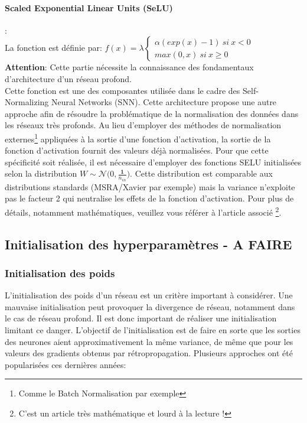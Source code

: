 \paragraph{Scaled Exponential Linear Units (SeLU)}: \\
La fonction est définie par: $f(x)=\lambda\left\{\begin{array}{ll} \alpha(exp(x)-1) \ si \ x<0 \\max(0,x) \ si \ x\geq 0\end{array}\right.$\\

\noindent  \textbf{Attention}: Cette partie nécessite la connaissance des fondamentaux d'architecture d'un réseau profond.\\

\noindent  Cette fonction est une des composantes utilisée dans le cadre des Self-Normalizing Neural Networks\cite{snn} (SNN). Cette architecture propose une autre approche afin de résoudre la problématique de la normalisation des données dans les réseaux très profonds. Au lieu d'employer des méthodes de normalisation externes\footnote{Comme le Batch Normalisation par exemple} appliquées à la sortie d'une fonction d'activation, la sortie de la fonction d'activation fournit des valeurs déjà normalisées. Pour que cette spécificité soit réalisée, il est nécessaire d'employer des fonctions SELU initialisées selon la distribution $W\sim \mathcal{N}\big(0,\frac{\textbf{1}}{n_{in}}\big)$. Cette distribution est comparable aux distributions standards (MSRA/Xavier par exemple) mais la variance n'exploite pas le facteur 2 qui neutralise les effets de la fonction d'activation. Pour plus de détails, notamment mathématiques, veuillez vous référer à l'article associé \cite{snn}\footnote{C'est un article très mathématique et lourd à la lecture !}.

\subsection{Initialisation des hyperparamètres - A FAIRE}
\subsubsection{Initialisation des poids}
\label{init_weight}
L'initialisation des poids d'un réseau est un critère important à considérer. Une mauvaise initialisation peut provoquer la divergence de réseau, notamment dans le cas de réseau profond. Il est donc important de réaliser une initialisation limitant ce danger. L'objectif de l'initialisation est de faire en sorte que les sorties des neurones aient approximativement la même variance, de même que pour les valeurs des gradients obtenus par rétropropagation. Plusieurs approches ont été popularisées ces dernières années:\\

